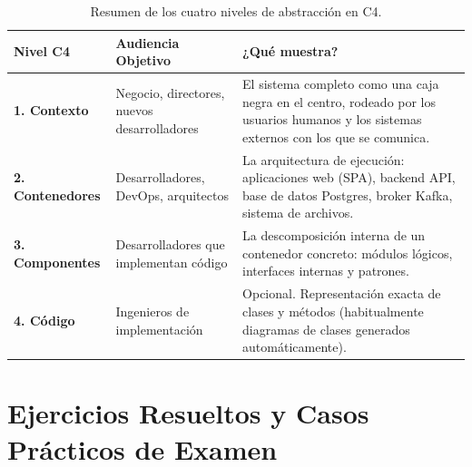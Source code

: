 \begin{table}[htbp]
\centering
\small
\begin{tabularx}{\textwidth}{l p{4.5cm} X}
\toprule
\textbf{Nivel C4} & \textbf{Audiencia Objetivo} & \textbf{¿Qué muestra?} \\
\midrule
\textbf{1. Contexto} & Negocio, directores, nuevos desarrolladores & El sistema completo como una caja negra en el centro, rodeado por los usuarios humanos y los sistemas externos con los que se comunica. \\
\addlinespace
\textbf{2. Contenedores} & Desarrolladores, DevOps, arquitectos & La arquitectura de ejecución: aplicaciones web (SPA), backend API, base de datos Postgres, broker Kafka, sistema de archivos. \\
\addlinespace
\textbf{3. Componentes} & Desarrolladores que implementan código & La descomposición interna de un contenedor concreto: módulos lógicos, interfaces internas y patrones. \\
\addlinespace
\textbf{4. Código} & Ingenieros de implementación & Opcional. Representación exacta de clases y métodos (habitualmente diagramas de clases generados automáticamente). \\
\bottomrule
\end{tabularx}
\caption{Resumen de los cuatro niveles de abstracción en C4.}
\label{tab:c4-niveles}
\end{table}

\section{Ejercicios Resueltos y Casos Prácticos de Examen}
\label{sec:ejercicios-tema2}

